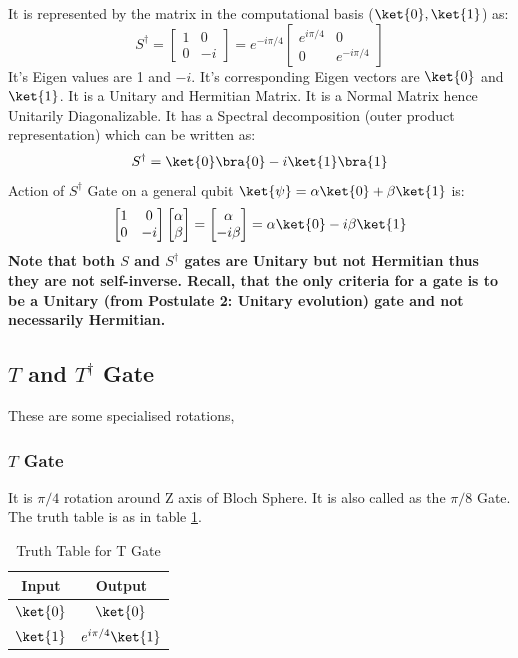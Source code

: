 \documentclass[12pt, oneside]{book}
\theoremstyle{definition}
\theoremstyle{definition}
\theoremstyle{remark}
\begin{document}
It is represented by the matrix in the computational basis ($\ket{0},\ket{1}$) as:
\[
    S^{\dagger}=\begin{bmatrix}
        1 & 0 \\
        0 & -i
    \end{bmatrix}=e^{-i\pi/4}\begin{bmatrix}
        e^{i\pi/4} & 0 \\
        0 & e^{-i\pi/4}
    \end{bmatrix}
\]
It's Eigen values are 1 and $-i$. It's corresponding Eigen vectors are $\ket{0}$ and $\ket{1}$.
It is a Unitary and Hermitian Matrix. It is a Normal Matrix hence Unitarily Diagonalizable.
It has a Spectral decomposition (outer product representation) which can be written as:
\[
    S^{\dagger}=\ket{0}\bra{0}-i\ket{1}\bra{1}
\]
Action of $S^{\dagger}$ Gate on a general qubit $\ket{\psi}=\alpha\ket{0}+\beta\ket{1}$ is:
\[
    \begin{bmatrix}
        1 & 0 \\
        0 & -i
    \end{bmatrix}\begin{bmatrix}
        \alpha \\
        \beta
    \end{bmatrix}=\begin{bmatrix}
        \alpha \\
        -i\beta
    \end{bmatrix}=\alpha\ket{0}-i\beta\ket{1}
\]
\textbf{Note that both $S$ and $S^{\dagger}$ gates are Unitary but not Hermitian thus they are not self-inverse. Recall, that 
the only criteria for a gate is to be a Unitary (from Postulate 2: Unitary evolution) gate and not necessarily Hermitian.}

\subsection{\texorpdfstring{$T$ and $T^{\dagger}$ Gate}{T and T^\dagger Gate}}
These are some specialised rotations,
\subsubsection{$T$ Gate}
It is $\pi/4$ rotation around Z axis of Bloch Sphere.
It is also called as the $\pi/8$ Gate. The truth table is as in table \ref{tab:t}.
\begin{table}[H]
    \centering
    \begin{tabular}{|c|c|}
        \hline
        Input & Output\\
        \hline
        $\ket{0}$ & $\ket{0}$\\
        $\ket{1}$ & $e^{i\pi/4}\ket{1}$\\
        \hline
    \end{tabular}
    \caption{Truth Table for T Gate}
    \label{tab:t}
\end{table}
\end{document}
